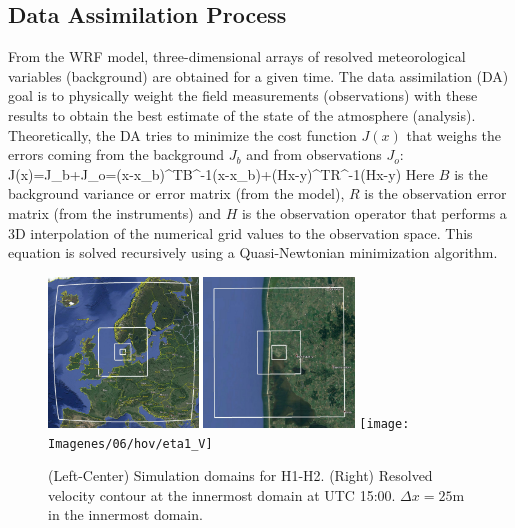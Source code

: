 \subsection{Data Assimilation Process}
From the WRF model, three-dimensional arrays of  resolved meteorological variables (background) are obtained for a given time. The data assimilation (DA) goal is to physically weight the field measurements (observations) with these results to obtain the best estimate of the state of the atmosphere (analysis). Theoretically, the DA tries to minimize the cost function $J(x)$ that weighs the errors coming from the background $J_b$ and from observations $J_o$:
\be 
J(x)=J_b+J_o=(x-x_b)^TB^{-1}(x-x_b)+(Hx-y)^TR^{-1}(Hx-y)
\ee
Here $B$ is the background variance or error matrix (from the model), $R$ is the observation error matrix (from the instruments) and $H$ is the observation operator that performs a 3D interpolation of the numerical grid values to the observation space.  This equation is solved recursively using a Quasi-Newtonian minimization algorithm.
\begin{figure}[H]
	\centering
	\includegraphics[height=4cm,trim={5mm 3mm 3mm 3mm},clip,frame]{Imagenes/05/hov_dom1_edit.jpg}
	\includegraphics[height=4cm,trim={5mm 3mm 3mm 3mm},clip,frame]{Imagenes/05/hov_dom2_edit.jpg}
	\texttt{[image: Imagenes/06/hov/eta1\_V]}%
	\caption{(Left-Center) Simulation domains for H1-H2. (Right) Resolved velocity contour at the innermost domain at UTC 15:00. $\Delta x = 25$m in the innermost domain.}
	\label{fig:05_dom_hov}
\end{figure}
